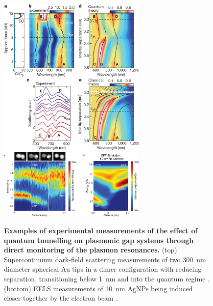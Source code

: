 \documentclass{article}
\begin{document}
\begin{figure}[bt]
\centering
\includegraphics[width=0.65\textwidth, clip=true, trim=0 500 0 0]{figures/literature/nature11653-f2_2}\\
\includegraphics[width=0.65\textwidth]{figures/literature/nl-2012-04078v_0001}
\caption[Examples of experimental measurements of the effect of quantum tunnelling on plasmonic gap systems]{\textbf{Examples of experimental measurements of the effect of quantum tunnelling on plasmonic gap systems through direct monitoring of the plasmon resonances.} (top) Supercontinuum dark-field scattering measurements of two \SI{300}{nm} diameter spherical Au tips in a dimer configuration with reducing separation, transitioning below \SI{1}{nm} and into the quantum regime \cite{savage2012}. (bottom) EELS measurements of \SI{10}{nm} AgNPs being induced closer together by the electron beam \cite{scholl2013}.}
\label{fig:tunnelling_plasmonics}
\end{figure}
\end{document}
